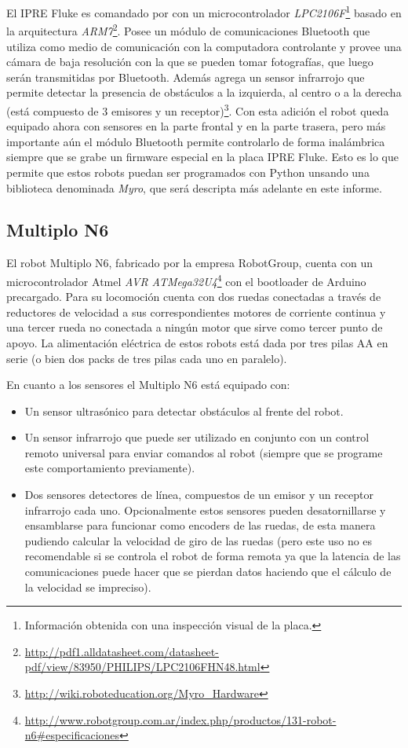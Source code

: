 El IPRE Fluke es comandado por con un microcontrolador
\textit{LPC2106F}\footnote{Información obtenida con una inspección visual
de la placa.}
basado en la arquitectura
\textit{ARM7}\footnote{\url{http://pdf1.alldatasheet.com/datasheet-pdf/view/83950/PHILIPS/LPC2106FHN48.html}}. Posee un módulo de comunicaciones
Bluetooth que utiliza como medio de comunicación con la computadora
controlante y
provee una cámara de baja resolución con la que se pueden tomar fotografías,
que luego serán transmitidas por Bluetooth. Además agrega
un sensor infrarrojo que permite detectar la presencia de obstáculos
a la izquierda, al centro o a la derecha (está compuesto de 3 emisores
y un
receptor)\footnote{\url{http://wiki.roboteducation.org/Myro_Hardware}}.
Con esta adición el robot queda equipado ahora con sensores
en la parte frontal y en la parte trasera, pero más importante aún
el módulo Bluetooth permite controlarlo de forma inalámbrica siempre
que se grabe un firmware especial en la placa IPRE Fluke. Esto es lo que permite
que estos robots puedan ser programados con Python unsando una biblioteca denominada
\textit{Myro}, que será descripta más adelante en este informe.

\subsection{Multiplo N6}
El robot Multiplo N6, fabricado por la empresa RobotGroup, cuenta con un
microcontrolador Atmel
\textit{AVR ATMega32U4}\footnote{\url{http://www.robotgroup.com.ar/index.php/productos/131-robot-n6\#especificaciones}}
con el bootloader de Arduino
precargado. Para su locomoción cuenta con dos ruedas conectadas a través
de reductores de velocidad a sus correspondientes motores de
corriente continua y una tercer
rueda no conectada a ningún motor que sirve como tercer punto de apoyo.
La alimentación eléctrica de estos robots está dada por tres pilas AA
en serie (o bien dos packs de tres pilas cada uno en paralelo).

En cuanto a los sensores el Multiplo N6 está equipado con:
\begin{itemize}
    \item Un sensor ultrasónico para detectar obstáculos al frente del
        robot.
    \item Un sensor infrarrojo que puede ser utilizado en conjunto con
        un control remoto universal para enviar comandos al robot
        (siempre que se programe este comportamiento previamente).
    \item Dos sensores detectores de línea, compuestos de un emisor y
        un receptor infrarrojo cada uno. Opcionalmente estos sensores
        pueden desatornillarse y ensamblarse
        para funcionar como encoders de las ruedas, de esta manera pudiendo
        calcular la velocidad de giro de las ruedas (pero este uso
        no es recomendable si se controla el robot de forma remota
        ya que la latencia de las comunicaciones puede hacer que se pierdan
        datos haciendo que el cálculo de la velocidad se impreciso).
\end{itemize}

